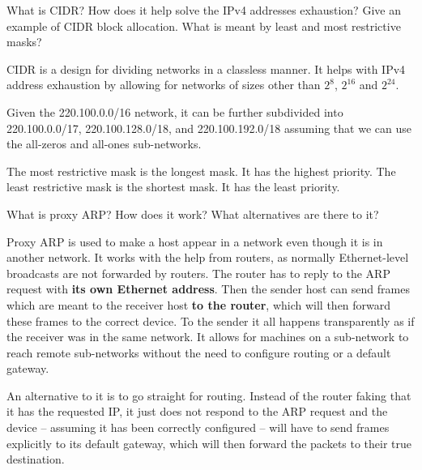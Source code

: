 \begin{Exercise}
What is CIDR? How does it help solve the IPv4 addresses exhaustion?
Give an example of CIDR block allocation.
What is meant by least and most restrictive masks?
\end{Exercise}
\begin{Answer}
CIDR is a design for dividing networks in a classless manner.
It helps with IPv4 address exhaustion by allowing for networks of sizes other than \(2^{8}\), \(2^{16}\) and \(2^{24}\).

Given the 220.100.0.0/16 network, it can be further subdivided into 220.100.0.0/17, 220.100.128.0/18, and 220.100.192.0/18 assuming that we can use the all-zeros and all-ones sub-networks.

The most restrictive mask is the longest mask. It has the highest priority.
The least restrictive mask is the shortest mask. It has the least priority.
\end{Answer}

\begin{Exercise}
\end{Exercise}

\begin{Exercise}
What is proxy ARP? How does it work? What alternatives are there to it?
\end{Exercise}
\begin{Answer}
Proxy ARP is used to make a host appear in a network even though it is in another network.
It works with the help from routers, as normally Ethernet-level broadcasts are not forwarded by routers.
The router has to reply to the ARP request with \textbf{its own Ethernet address}.
Then the sender host can send frames which are meant to the receiver host \textbf{to the router}, which will then forward these frames to the correct device.
To the sender it all happens transparently as if the receiver was in the same network.
It allows for machines on a sub-network to reach remote sub-networks without the need to configure routing or a default gateway.

An alternative to it is to go straight for routing. Instead of the router faking that it has the requested IP, it just does not respond to the ARP request and the device -- assuming it has been correctly configured -- will have to send frames explicitly to its default gateway, which will then forward the packets to their true destination.
\end{Answer}

